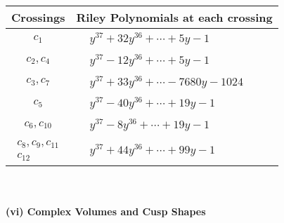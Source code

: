 \documentclass[1p]{elsarticle_modified}
\theoremstyle{definition}
\begin{document}
\begin{tabular}{m{50pt}|m{274pt}}
Crossings & \hspace{64pt}Riley Polynomials at each crossing \\
\hline $$\begin{aligned}c_{1}\end{aligned}$$&$\begin{aligned}
&y^{37}+32 y^{36}+\cdots+5 y-1
\end{aligned}$\\
\hline $$\begin{aligned}c_{2},c_{4}\end{aligned}$$&$\begin{aligned}
&y^{37}-12 y^{36}+\cdots+5 y-1
\end{aligned}$\\
\hline $$\begin{aligned}c_{3},c_{7}\end{aligned}$$&$\begin{aligned}
&y^{37}+33 y^{36}+\cdots-7680 y-1024
\end{aligned}$\\
\hline $$\begin{aligned}c_{5}\end{aligned}$$&$\begin{aligned}
&y^{37}-40 y^{36}+\cdots+19 y-1
\end{aligned}$\\
\hline $$\begin{aligned}c_{6},c_{10}\end{aligned}$$&$\begin{aligned}
&y^{37}-8 y^{36}+\cdots+19 y-1
\end{aligned}$\\
\hline $$\begin{aligned}c_{8},c_{9},c_{11}\\c_{12}\end{aligned}$$&$\begin{aligned}
&y^{37}+44 y^{36}+\cdots+99 y-1
\end{aligned}$\\
\hline
\end{tabular}\\~\\
\newpage\flushleft \textbf{(vi) Complex Volumes and Cusp Shapes}
\end{document}
